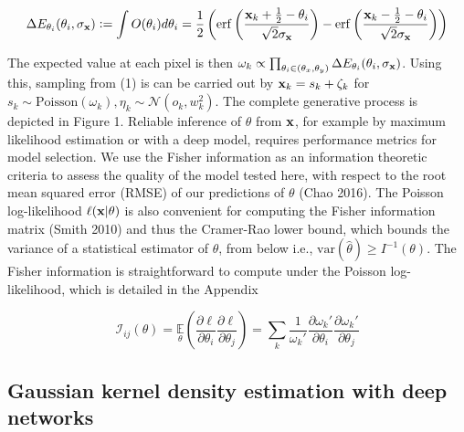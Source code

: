 \documentclass{article}
\begin{document}
\begin{equation}
\Delta E_{\theta_{i}}(\theta_{i},\sigma_{\bold{x}}) \vcentcolon = \int O(\theta_{i})d\theta_{i} = \frac{1}{2}\left(\mathrm{erf}\left(\frac{\bold{x}_{k}+\frac{1}{2}-\theta_{i}}{\sqrt{2}\sigma_{\bold{x}}}\right) -\mathrm{erf}\left(\frac{\bold{x}_{k}-\frac{1}{2}-\theta_{i}}{\sqrt{2}\sigma_{\bold{x}}}\right)\right)
\end{equation}

The expected value at each pixel is then $\omega_{k}\propto \prod_{\theta_{i}\in (\theta_{x},\theta_{y})} \Delta E_{\theta_{i}}(\theta_{i},\sigma_{\bold{x}}) $. Using this, sampling from (1) is can be carried out by $\bold{x}_{k} = s_{k} + \zeta_{k}$ for $s_{k}\sim \mathrm{Poisson}(\omega_{k}), \eta_{k}\sim \mathcal{N}(o_{k},w_{k}^{2})$. The complete generative process is depicted in Figure 1. Reliable inference of $\theta$ from $\bold{x}$, for example by maximum likelihood estimation or with a deep model, requires performance metrics for model selection. We use the Fisher information as an information theoretic criteria to assess the quality of the model tested here, with respect to the root mean squared error (RMSE) of our predictions of $\theta$ (Chao 2016). The Poisson log-likelihood $\ell(\bold{x}|\theta)$ is also convenient for computing the Fisher information matrix (Smith 2010) and thus the Cramer-Rao lower bound, which bounds the variance of a statistical estimator of $\theta$, from below i.e., $\mathrm{var}(\hat{\theta}) \geq I^{-1}(\theta)$. The Fisher information is straightforward to compute under the Poisson log-likelihood, which is detailed in the Appendix

\begin{equation}
\mathcal{I}_{ij}(\theta) = \underset{\theta}{\mathbb{E}}\left(\frac{\partial \ell}{\partial\theta_{i}}\frac{\partial\ell}{\partial\theta_{j}}\right) = \sum_{k}\frac{1}{\omega_{k}'}\frac{\partial \omega_{k}'}{\partial\theta_{i}}\frac{\partial \omega_{k}'}{\partial\theta_{j}}
\end{equation}

\subsection{Gaussian kernel density estimation with deep networks}
\end{document}
